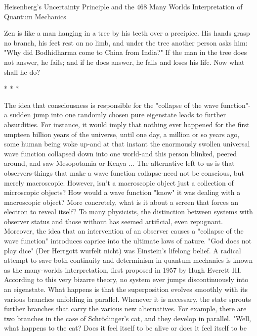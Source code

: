 Heisenberg's Uncertainty Principle and the                                         468
Many Worlds Interpretation of Quantum Mechanics

   Zen is like a man hanging in a tree by his teeth over a precipice. His hands grasp
   no branch, his feet rest on no limb, and under the tree another person asks him:
   "Why did Bodhidharma come to China from India?" If the man in the tree does
   not answer, he fails; and if he does answer, he falls and loses his life. Now what
   shall he do?

                                         *   *   *

        The idea that consciousness is responsible for the "collapse of the wave
function"-a sudden jump into one randomly chosen pure eigenstate leads to further
absurdities. For instance, it would imply that nothing ever happened for the first
umpteen billion years of the universe, until one day, a million or so years ago, some
human being woke up-and at that instant the enormously swollen universal wave
function collapsed down into one world-and this person blinked, peered around, and
saw Mesopotamia or Kenya ...
        The alternative left to us is that observers-things that make a wave function
collapse-need not be conscious, but merely macroscopic. However, isn't a
macroscopic object just a collection of microscopic objects? How would a wave
function "know" it was dealing with a macroscopic object? More concretely, what is it
about a screen that forces an electron to reveal itself?
        To many physicists, the distinction between systems with observer status and
those without has seemed artificial, even repugnant. Moreover, the idea that an
intervention of an observer causes a "collapse of the wave function" introduces
caprice into the ultimate laws of nature. "God does not play dice" (Der Herrgott
wurfelt nicht) was Einstein's lifelong belief.
        A radical attempt to save both continuity and determinism in quantum
mechanics is known as the many-worlds interpretation, first proposed in 1957 by
Hugh Everett III. According to this very bizarre theory, no system ever jumps
discontinuously into an eigenstate. What happens is that the superposition evolves
smoothly with its various branches unfolding in parallel. Whenever it is necessary, the
state sprouts further branches that carry the various new alternatives. For example,
there are two branches in the case of Schrödinger’s cat, and they develop in parallel.
"Well, what happens to the cat? Does it feel itself to be alive or does it feel itself to be
